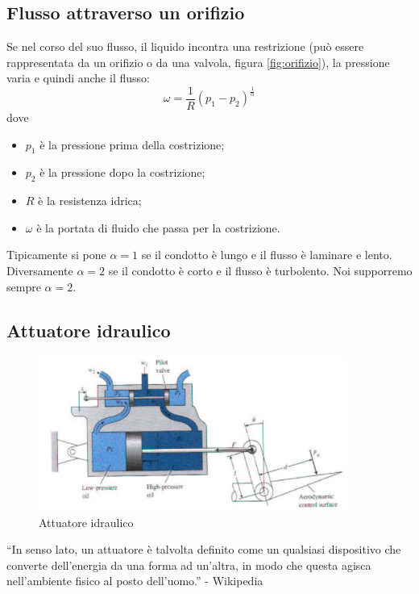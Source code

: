 \documentclass[a4paper]{report}
\begin{document}
\subsection{Flusso attraverso un orifizio}
Se nel corso del suo flusso, il liquido incontra una restrizione
(pu\`o essere rappresentata da un orifizio o da una valvola, figura \ref{fig:orifizio}), la
pressione varia e quindi anche il flusso:
\begin{equation}\label{eq:orifizio}
  \omega = \frac{1}{R} (p_1 - p_2)^{\frac{1}{\alpha}}
\end{equation}
dove
\begin{itemize}
\item $p_1$ \`e la pressione prima della costrizione;
\item $p_2$ \`e la pressione dopo la costrizione;
\item $R$ \`e la resistenza idrica;
\item $\omega$ \`e la portata di fluido che passa per la costrizione.
\end{itemize}
Tipicamente si pone $\alpha = 1$ se il condotto \`e lungo e il flusso
\`e laminare e lento. Diversamente $\alpha = 2$ se il condotto \`e
corto e il flusso \`e turbolento. Noi supporremo sempre $\alpha = 2$.

\subsection{Attuatore idraulico}
\begin{figure}[!b]
\centering
\includegraphics[width=0.9\textwidth]{./images/attuatoreidraulico.png}
\caption{Attuatore idraulico\label{fig:attuatoreidraulico}}
\end{figure}
``In senso lato, un attuatore \`e talvolta definito come un qualsiasi
dispositivo che converte dell'energia da una forma ad un'altra, in
modo che questa agisca nell'ambiente fisico al posto dell'uomo.'' -
Wikipedia 
\end{document}
